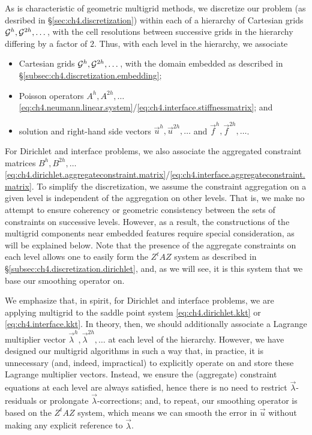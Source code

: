 As is characteristic of geometric multigrid methods, we discretize our problem (as desribed in \S\ref{sec:ch4.discretization}) within each of a hierarchy of Cartesian grids $\mathcal{G}^h, \mathcal{G}^{2h}, \dotsc$, with the cell resolutions between successive grids in the hierarchy differing by a factor of $2$. Thus, with each level in the hierarchy, we associate
\begin{itemize}
\item Cartesian grids $\mathcal{G}^h, \mathcal{G}^{2h}, \dotsc$, with the domain embedded as described in \S\ref{subsec:ch4.discretization.embedding};
\item Poisson operators $A^h, A^{2h}, \dotsc$ \eqref{eq:ch4.neumann.linear.system}/\eqref{eq:ch4.interface.stiffnessmatrix}; and
\item solution and right-hand side vectors $\vec{u}^h, \vec{u}^{2h}, \dotsc$ and $\vec{f}^h, \vec{f}^{2h}, \dotsc$.
\end{itemize}
For Dirichlet and interface problems, we also associate the aggregated constraint matrices $B^h, B^{2h}, \dotsc$ \eqref{eq:ch4.dirichlet.aggregateconstraint.matrix}/\eqref{eq:ch4.interface.aggregateconstraint.matrix}. To simplify the discretization, we assume the constraint aggregation on a given level is independent of the aggregation on other levels. That is, we make no attempt to ensure coherency or geometric consistency between the sets of constraints on successive levels. However, as a result, the constructions of the multigrid components near embedded features require special consideration, as will be explained below. Note that the presence of the aggregate constraints on each level allows one to easily form the $Z^tAZ$ system as described in \S\ref{subsec:ch4.discretization.dirichlet}, and, as we will see, it is this system that we base our smoothing operator on.

We emphasize that, in spirit, for Dirichlet and interface problems, we are applying multigrid to the saddle point system \eqref{eq:ch4.dirichlet.kkt} or \eqref{eq:ch4.interface.kkt}. In theory, then, we should additionally associate a Lagrange multiplier vector $\vec{\lambda}^h, \vec{\lambda}^{2h}, \dotsc$ at each level of the hierarchy. However, we have designed our multigrid algorithms in such a way that, in practice, it is unnecessary (and, indeed, impractical) to explicitly operate on and store these Lagrange multiplier vectors. Instead, we ensure the (aggregate) constraint equations at each level are always satisfied, hence there is no need to restrict $\vec{\lambda}$-residuals or prolongate $\vec{\lambda}$-corrections; and, to repeat, our smoothing operator is based on the $Z^tAZ$ system, which means we can smooth the error in $\vec{u}$ without making any explicit reference to $\vec{\lambda}$.

